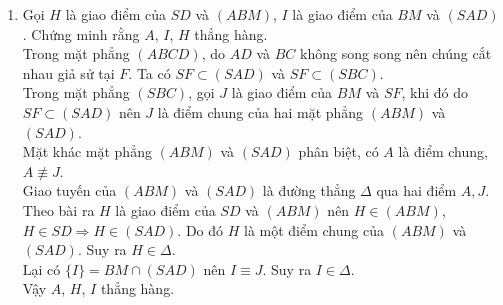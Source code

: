 \begin{bt}
\begin{bt}
{\begin{enumerate}
			Do $M \in SC$ nên $AM \subset (SAC)$. Trong mặt phẳng $(SAC)$, gọi $E$ là giao điểm của hai đường thẳng $SO$ và $AM$.\\
			Ta có $E \in SO,\ SO \subset (SBD) \Rightarrow E \in (SBD)$ và $E \in AM$.\\
			Vậy $E$ là giao điểm của $AM$ và mặt phẳng $(SBD)$.
			\item Gọi $H$ là giao điểm của $SD$ và $(ABM)$, $I$ là giao điểm của $BM$ và $(SAD)$. Chứng minh rằng $A$, $I$, $H$ thẳng hàng.\\
			Trong mặt phẳng $(ABCD)$, do $AD$ và $BC$ không song song nên chúng cắt nhau giả sử tại $F$. Ta có $SF \subset(SAD)$ và $SF \subset (SBC)$.\\
			Trong mặt phẳng $(SBC)$, gọi $J$ là giao điểm của $BM$ và $SF$, khi đó do $SF \subset (SAD)$ nên $J$ là điểm chung của hai mặt phẳng $(ABM)$ và $(SAD)$.\\
			Mặt khác mặt phẳng $(ABM)$ và $(SAD)$ phân biệt, có $A$ là điểm chung, $A \not\equiv J$.\\
			Giao tuyến của $(ABM)$ và $(SAD)$ là đường thẳng $\Delta$ qua hai điểm $A, J$.\\
			Theo bài ra $H$ là giao điểm của $SD$ và $(ABM)$ nên $H \in (ABM)$, $H \in SD \Rightarrow H \in (SAD)$. Do đó $H$ là một điểm chung của $(ABM)$ và $(SAD)$. Suy ra $H \in \Delta$.\\
			Lại có $\{I\}=BM \cap (SAD)$ nên $I \equiv J$. Suy ra $I \in \Delta$.\\
			Vậy $A$, $H$, $I$ thẳng hàng.
		\end{enumerate}			
	}
\end{bt}


\end{bt}
